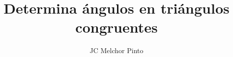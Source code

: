 \documentclass[12pt,addpoints,answers]{guia}
\title{Determina ángulos en triángulos congruentes}
\author{JC Melchor Pinto}
\begin{document}
\pagestyle{headandfoot}%
\INFO%
\begin{multicols}{2}
    
    
    \columnbreak
    
\end{multicols}%



\ejemplosboxed[]
\begin{questions}
    \questionboxed[10]{}
    \ejemplosboxed[]
    \questionboxed[10]{}
    \ejemplosboxed[]
    \questionboxed[10]{}
    \questionboxed[10]{}
    \ejemplosboxed[]
    \questionboxed[10]{}
    \ejemplosboxed[]
    \questionboxed[10]{}
    \ejemplosboxed[]
    \questionboxed[10]{}
    \questionboxed[10]{}
    \ejemplosboxed[]
    \questionboxed[10]{}
    \questionboxed[10]{}
\end{questions}
\end{document}
